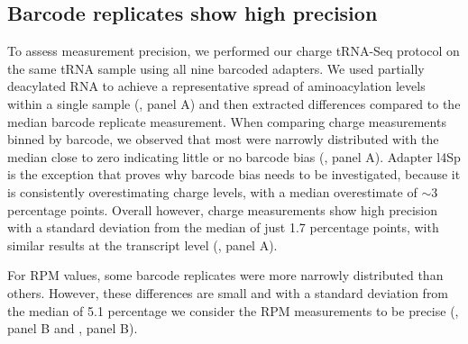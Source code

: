 \documentclass[9pt,lineno]{elife}
\begin{document}
\begin{figure}[ht!]
\label{figsupp:f3S2}
\end{figure}





\subsection{Barcode replicates show high precision}
To assess measurement precision, we performed our charge tRNA-Seq protocol on the same tRNA sample using all nine barcoded adapters.
We used partially deacylated RNA to achieve a representative spread of aminoacylation levels within a single sample (, panel A) and then extracted differences compared to the median barcode replicate measurement.
When comparing charge measurements binned by barcode, we observed that most were narrowly distributed with the median close to zero indicating little or no barcode bias (, panel A).
Adapter l4Sp is the exception that proves why barcode bias needs to be investigated, because it is consistently overestimating charge levels, with a median overestimate of $\sim$3 percentage points.
Overall however, charge measurements show high precision with a standard deviation from the median of just 1.7 percentage points, with similar results at the transcript level (, panel A).

For RPM values, some barcode replicates were more narrowly distributed than others. However, these differences are small and with a standard deviation from the median of 5.1 percentage we consider the RPM measurements to be precise (, panel B and , panel B).
\end{document}
